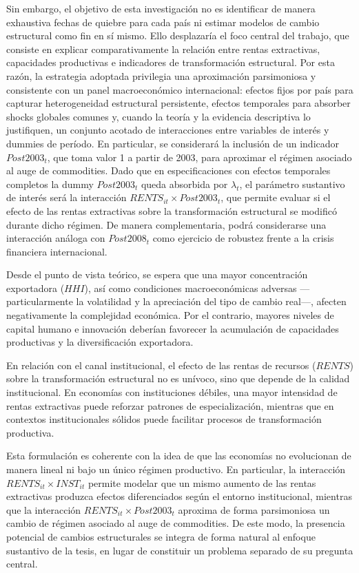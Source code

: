 \documentclass[../../PTFM.tex]{subfiles}
\begin{document}
	Sin embargo, el objetivo de esta investigación no es identificar de
	manera exhaustiva fechas de quiebre para cada país ni estimar modelos de
	cambio estructural como fin en sí mismo. Ello desplazaría el foco central
	del trabajo, que consiste en explicar comparativamente la relación entre
	rentas extractivas, capacidades productivas e indicadores de
	transformación estructural. Por esta razón, la estrategia adoptada
	privilegia una aproximación parsimoniosa y consistente con un panel
	macroeconómico internacional: efectos fijos por país para capturar
	heterogeneidad estructural persistente, efectos temporales para absorber
	shocks globales comunes y, cuando la teoría y la evidencia descriptiva lo
	justifiquen, un conjunto acotado de interacciones entre variables de
	interés y dummies de período. En particular, se considerará la inclusión
	de un indicador $Post2003_t$, que toma valor 1 a partir de 2003, para
	aproximar el régimen asociado al auge de commodities. Dado que en
	especificaciones con efectos temporales completos la dummy $Post2003_t$
	queda absorbida por $\lambda_t$, el parámetro sustantivo de interés será
	la interacción $RENTS_{it} \times Post2003_t$, que permite evaluar si el
	efecto de las rentas extractivas sobre la transformación estructural se
	modificó durante dicho régimen. De manera complementaria, podrá
	considerarse una interacción análoga con $Post2008_t$ como ejercicio de
	robustez frente a la crisis financiera internacional.

	Desde el punto de vista teórico, se espera que una mayor concentración exportadora ($HHI$), así como condiciones macroeconómicas adversas ---particularmente la volatilidad y la apreciación del tipo de cambio real---, afecten negativamente la complejidad económica. Por el contrario, mayores niveles de capital humano e innovación deberían favorecer la acumulación de capacidades productivas y la diversificación exportadora.

	En relación con el canal institucional, el efecto de las rentas de recursos ($RENTS$) sobre la transformación estructural no es unívoco, sino que depende de la calidad institucional. En economías con instituciones débiles, una mayor intensidad de rentas extractivas puede reforzar patrones de especialización, mientras que en contextos institucionales sólidos puede facilitar procesos de transformación productiva.

	Esta formulación es coherente con la idea de que las economías no
	evolucionan de manera lineal ni bajo un único régimen productivo. En
	particular, la interacción $RENTS_{it} \times INST_{it}$ permite modelar
	que un mismo aumento de las rentas extractivas produzca efectos
	diferenciados según el entorno institucional, mientras que la interacción
	$RENTS_{it} \times Post2003_t$ aproxima de forma parsimoniosa un cambio de
	régimen asociado al auge de commodities. De este modo, la presencia
	potencial de cambios estructurales se integra de forma natural al enfoque
	sustantivo de la tesis, en lugar de constituir un problema separado de su
	pregunta central.
\end{document}
